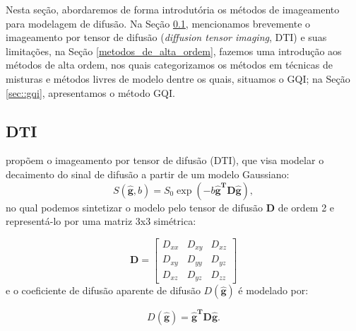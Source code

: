 \documentclass[
    12pt,                %
    oneside,            %
    a4paper,            %
    english,            %
    french,                %
    spanish,            %
    brazil                %
    ]{abntex2}
\begin{document}
Nesta seção, abordaremos de forma introdutória os métodos de imageamento para modelagem de difusão. Na Seção \ref{sec::dti_limitacoes_hardi}, mencionamos brevemente o imageamento por tensor de difusão (\textit{diffusion tensor imaging}, DTI) e suas limitações, na Seção \ref{metodos_de_alta_ordem}, fazemos uma introdução aos métodos de alta ordem, nos quais categorizamos os métodos em técnicas de misturas e métodos livres de modelo dentre os quais, situamos o GQI; na Seção \ref{sec::gqi}, apresentamos o método GQI.




\subsection{DTI}
\label{sec::dti_limitacoes_hardi}

 propõem o imageamento por tensor de difusão (DTI), que visa modelar o decaimento do sinal de difusão a partir de um modelo Gaussiano: 
\begin{equation}
\label{eq::stanner}
    S(\mathbf{\hat{g}}, b) = S_0\exp{(-b\mathbf{\hat{g}^T}\mathbf{D}\mathbf{\hat{g}})}, 
\end{equation}
no qual podemos sintetizar o modelo pelo tensor de difusão $\mathbf{D}$ de ordem 2 e representá-lo por uma matriz 3x3 simétrica:

\begin{equation}
\label{eq::tensor}
\mathbf{D} = 
\begin{bmatrix}
D_{xx} & D_{xy} & D_{xz} \\ 
D_{xy} & D_{yy} & D_{yz} \\ 
D_{xz} & D_{yz} & D_{zz}  
\end{bmatrix}
\end{equation}
e o coeficiente de difusão aparente de difusão $D(\mathbf{\hat{g}})$ é modelado por:

\begin{equation}
\label{eq::dti_model}
    D(\mathbf{\hat{g}}) = \mathbf{\hat{g}^T}\mathbf{D}\mathbf{\hat{g}}.
\end{equation}
\end{document}
